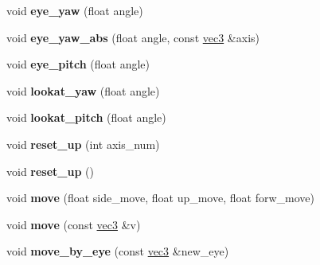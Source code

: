 \begin{DoxyCompactItemize}
\item 
\hypertarget{classViewModel_a35c9012be75dacb30922416659f0af46}{void {\bfseries eye\-\_\-yaw} (float angle)}\label{classViewModel_a35c9012be75dacb30922416659f0af46}

\item 
\hypertarget{classViewModel_ac30116aad383d1a2d79d9724fa63d185}{void {\bfseries eye\-\_\-yaw\-\_\-abs} (float angle, const \hyperlink{classvec3}{vec3} \&axis)}\label{classViewModel_ac30116aad383d1a2d79d9724fa63d185}

\item 
\hypertarget{classViewModel_a75033bb602092fe25869bd1917527125}{void {\bfseries eye\-\_\-pitch} (float angle)}\label{classViewModel_a75033bb602092fe25869bd1917527125}

\item 
\hypertarget{classViewModel_afd4ac481aec4f6aefce2cf132fc94461}{void {\bfseries lookat\-\_\-yaw} (float angle)}\label{classViewModel_afd4ac481aec4f6aefce2cf132fc94461}

\item 
\hypertarget{classViewModel_a969d98639465bc9070cf65f2895d075d}{void {\bfseries lookat\-\_\-pitch} (float angle)}\label{classViewModel_a969d98639465bc9070cf65f2895d075d}

\item 
\hypertarget{classViewModel_ad8202c184c32e16943bb2573b2432588}{void {\bfseries reset\-\_\-up} (int axis\-\_\-num)}\label{classViewModel_ad8202c184c32e16943bb2573b2432588}

\item 
\hypertarget{classViewModel_aebc98804971ecf43aceb2d15ab8f4237}{void {\bfseries reset\-\_\-up} ()}\label{classViewModel_aebc98804971ecf43aceb2d15ab8f4237}

\item 
\hypertarget{classViewModel_a9656e14c528aa71cfb1576ca6f0361d8}{void {\bfseries move} (float side\-\_\-move, float up\-\_\-move, float forw\-\_\-move)}\label{classViewModel_a9656e14c528aa71cfb1576ca6f0361d8}

\item 
\hypertarget{classViewModel_acdd719e31cfaef5f44b0e97469f230d9}{void {\bfseries move} (const \hyperlink{classvec3}{vec3} \&v)}\label{classViewModel_acdd719e31cfaef5f44b0e97469f230d9}

\item 
\hypertarget{classViewModel_aa4b4d1768152d92bd4fae411e69e5883}{void {\bfseries move\-\_\-by\-\_\-eye} (const \hyperlink{classvec3}{vec3} \&new\-\_\-eye)}\label{classViewModel_aa4b4d1768152d92bd4fae411e69e5883}


\end{DoxyCompactItemize}

